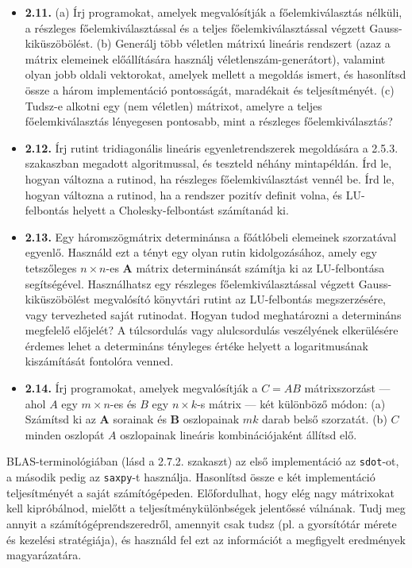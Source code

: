 \documentclass[
  magyar,
  11pt]{article}
\providecommand{\tightlist}{%
  \setlength{\itemsep}{0pt}\setlength{\parskip}{0pt}}
\providecommand{\boldsymbol}[1]{\mathbf{#1}}
\begin{document}
\begin{itemize}
\tightlist
\item
  \textbf{2.11.} (a) Írj programokat, amelyek megvalósítják a
  főelemkiválasztás nélküli, a részleges főelemkiválasztással és a
  teljes főelemkiválasztással végzett Gauss-kiküszöbölést. (b) Generálj
  több véletlen mátrixú lineáris rendszert (azaz a mátrix elemeinek
  előállítására használj véletlenszám-generátort), valamint olyan jobb
  oldali vektorokat, amelyek mellett a megoldás ismert, és hasonlítsd
  össze a három implementáció pontosságát, maradékait és teljesítményét.
  (c) Tudsz-e alkotni egy (nem véletlen) mátrixot, amelyre a teljes
  főelemkiválasztás lényegesen pontosabb, mint a részleges
  főelemkiválasztás?
\item
  \textbf{2.12.} Írj rutint tridiagonális lineáris egyenletrendszerek
  megoldására a 2.5.3. szakaszban megadott algoritmussal, és teszteld
  néhány mintapéldán. Írd le, hogyan változna a rutinod, ha részleges
  főelemkiválasztást vennél be. Írd le, hogyan változna a rutinod, ha a
  rendszer pozitív definit volna, és LU-felbontás helyett a
  Cholesky-felbontást számítanád ki.
\item
  \textbf{2.13.} Egy háromszögmátrix determinánsa a főátlóbeli elemeinek
  szorzatával egyenlő. Használd ezt a tényt egy olyan rutin
  kidolgozásához, amely egy tetszőleges \(n \times n\)-es
  \(\boldsymbol{A}\) mátrix determinánsát számítja ki az LU-felbontása
  segítségével. Használhatsz egy részleges főelemkiválasztással végzett
  Gauss-kiküszöbölést megvalósító könyvtári rutint az LU-felbontás
  megszerzésére, vagy tervezheted saját rutinodat. Hogyan tudod
  meghatározni a determináns megfelelő előjelét? A túlcsordulás vagy
  alulcsordulás veszélyének elkerülésére érdemes lehet a determináns
  tényleges értéke helyett a logaritmusának kiszámítását fontolóra
  venned.
\item
  \textbf{2.14.} Írj programokat, amelyek megvalósítják a \(C = AB\)
  mátrixszorzást --- ahol \(A\) egy \(m \times n\)-es és \(B\) egy
  \(n \times k\)-s mátrix --- két különböző módon: (a) Számítsd ki az
  \(\boldsymbol{A}\) sorainak és \(\boldsymbol{B}\) oszlopainak \(mk\)
  darab belső szorzatát. (b) \(C\) minden oszlopát \(A\) oszlopainak
  lineáris kombinációjaként állítsd elő.
\end{itemize}

BLAS-terminológiában (lásd a 2.7.2. szakaszt) az első implementáció az
\texttt{sdot}-ot, a második pedig az \texttt{saxpy}-t használja.
Hasonlítsd össze e két implementáció teljesítményét a saját
számítógépeden. Előfordulhat, hogy elég nagy mátrixokat kell
kipróbálnod, mielőtt a teljesítménykülönbségek jelentőssé válnának. Tudj
meg annyit a számítógéprendszeredről, amennyit csak tudsz (pl. a
gyorsítótár mérete és kezelési stratégiája), és használd fel ezt az
információt a megfigyelt eredmények magyarázatára.
\end{document}
